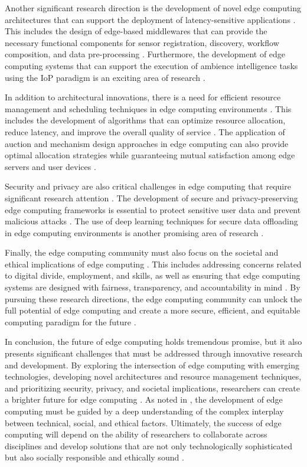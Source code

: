 \documentclass[11pt,a4paper]{article}
\begin{document}
Another significant research direction is the development of novel edge computing architectures that can support the deployment of latency-sensitive applications \cite{arxiv:1701.01090}. This includes the design of edge-based middlewares that can provide the necessary functional components for sensor registration, discovery, workflow composition, and data pre-processing \cite{arxiv:1912.06567}. Furthermore, the development of edge computing systems that can support the execution of ambience intelligence tasks using the IoP paradigm is an exciting area of research \cite{arxiv:2011.00236}. 

In addition to architectural innovations, there is a need for efficient resource management and scheduling techniques in edge computing environments \cite{arxiv:2108.08059}. This includes the development of algorithms that can optimize resource allocation, reduce latency, and improve the overall quality of service \cite{arxiv:2109.12983}. The application of auction and mechanism design approaches in edge computing can also provide optimal allocation strategies while guaranteeing mutual satisfaction among edge servers and user devices \cite{arxiv:2105.03559}. 

Security and privacy are also critical challenges in edge computing that require significant research attention \cite{arxiv:2206.07164}. The development of secure and privacy-preserving edge computing frameworks is essential to protect sensitive user data and prevent malicious attacks \cite{arxiv:1805.03591}. The use of deep learning techniques for secure data offloading in edge computing environments is another promising area of research \cite{arxiv:2204.10282}. 

Finally, the edge computing community must also focus on the societal and ethical implications of edge computing \cite{arxiv:2107.13374}. This includes addressing concerns related to digital divide, employment, and skills, as well as ensuring that edge computing systems are designed with fairness, transparency, and accountability in mind \cite{arxiv:2205.01423}. By pursuing these research directions, the edge computing community can unlock the full potential of edge computing and create a more secure, efficient, and equitable computing paradigm for the future \cite{arxiv:2309.05416}. 

In conclusion, the future of edge computing holds tremendous promise, but it also presents significant challenges that must be addressed through innovative research and development. By exploring the intersection of edge computing with emerging technologies, developing novel architectures and resource management techniques, and prioritizing security, privacy, and societal implications, researchers can create a brighter future for edge computing \cite{arxiv:2407.17314}. As noted in \cite{arxiv:2401.11305}, the development of edge computing must be guided by a deep understanding of the complex interplay between technical, social, and ethical factors. Ultimately, the success of edge computing will depend on the ability of researchers to collaborate across disciplines and develop solutions that are not only technologically sophisticated but also socially responsible and ethically sound \cite{arxiv:2311.01224}.
\end{document}
